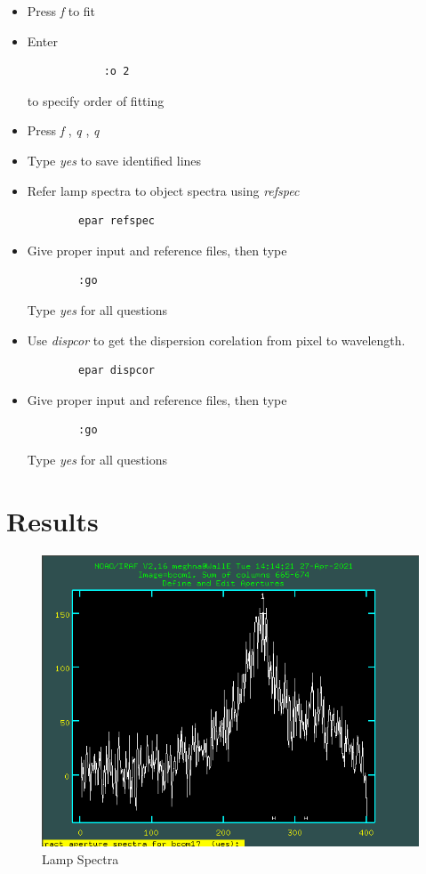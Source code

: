 \documentclass[letterpaper,11pt]{report}
\begin{document}
\begin{itemize}
\begin{table}[h!]
            \label{tab:my_label}
        \end{table}
    \item Press \emph{f} to fit
    \item Enter \begin{lstlisting}
            :o 2
        \end{lstlisting} to specify order of fitting
    \item Press \emph{f} , \emph{q} , \emph{q} 
    \item Type \emph{yes} to save identified lines
    \item Refer lamp spectra to object spectra using \emph{refspec}
        \begin{lstlisting}
        epar refspec
        \end{lstlisting}
    \item Give proper input and reference files, then type
        \begin{lstlisting}
        :go
        \end{lstlisting} 
        Type \emph{yes} for all questions
    \item Use \emph{dispcor} to get the dispersion corelation from pixel to wavelength.
        \begin{lstlisting}
        epar dispcor
        \end{lstlisting}
    \item Give proper input and reference files, then type
        \begin{lstlisting}
        :go
        \end{lstlisting} 
        Type \emph{yes} for all questions
\end{itemize}

\section{Results}

\begin{figure}[H]
    \centering
    \includegraphics[scale=0.4]{iraf/lamp spectra.png}
    \caption{Lamp Spectra}
    \label{fig:my_label}
\end{figure}
\end{document}
